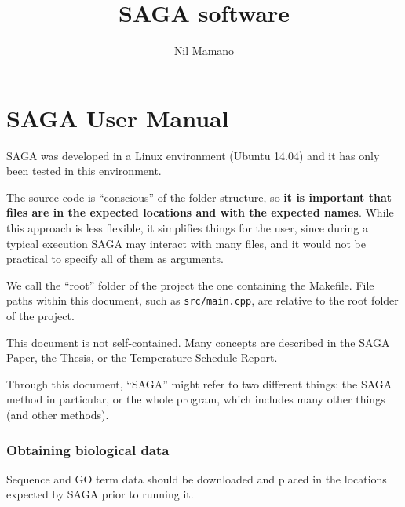 \documentclass[]{article}
\title{SAGA software}
\author{Nil Mamano}
\begin{document}
\maketitle


\part{SAGA User Manual} %

SAGA was developed in a Linux environment (Ubuntu 14.04) and it has only been tested in this environment.

The source code is ``conscious'' of the folder structure, so \textbf{it is important that files are in the expected locations and with the expected names}. While this approach is less flexible, it simplifies things for the user, since during a typical execution SAGA may interact with many files, and it would not be practical to specify all of them as arguments.

We call the ``root'' folder of the project the one containing the Makefile. File paths within this document, such as \texttt{src/main.cpp}, are relative to the root folder of the project.

This document is not self-contained. Many concepts are described in the SAGA Paper, the Thesis, or the Temperature Schedule Report.

Through this document, ``SAGA'' might refer to two different things: the SAGA method in particular, or the whole program, which includes many other things (and other methods).

\section{Obtaining biological data}\label{b:obtainbio}

Sequence and GO term data should be downloaded and placed in the locations expected by SAGA prior to running it.
\end{document}
